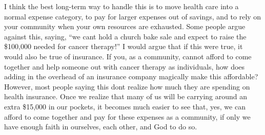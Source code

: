 I think the best long-term way to handle this is to move health care
into a normal expense category, to pay for larger expenses out of
savings, and to rely on your community when your own resources are
exhausted.  Some people argue against this, saying, “we
can{\textquotesingle}t hold a church bake sale and expect to raise the
\$100,000 needed for cancer therapy!”  I would argue that if this were
true, it would also be true of insurance.  If you, as a community,
cannot afford to come together and help someone out with cancer therapy
as individuals, how does adding in the overhead of an insurance company
magically make this affordable?  However, most people saying this
don{\textquotesingle}t realize how much they are spending on health
insurance.  Once we realize that many of us will be carrying around an
extra \$15,000 in our pockets, it becomes much easier to see that, yes,
we can afford to come together and pay for these expenses as a
community, if only we have enough faith in ourselves, each other, and
God to do so.

